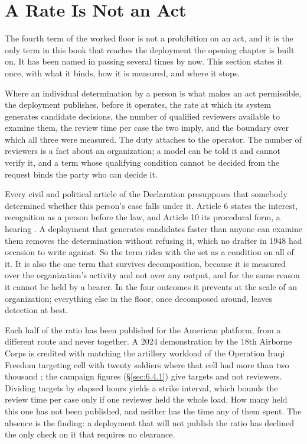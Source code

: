 \section{A Rate Is Not an Act}
\label{sec:3.6a}
The fourth term of the worked floor is not a prohibition on an act, and it is the only term in this book that reaches the deployment the opening chapter is built on. It has been named in passing several times by now. This section states it once, with what it binds, how it is measured, and where it stops.

Where an individual determination by a person is what makes an act permissible, the deployment publishes, before it operates, the rate at which its system generates candidate decisions, the number of qualified reviewers available to examine them, the review time per case the two imply, and the boundary over which all three were measured. The duty attaches to the operator. The number of reviewers is a fact about an organization; a model can be told it and cannot verify it, and a term whose qualifying condition cannot be decided from the request binds the party who can decide it.

Every civil and political article of the Declaration presupposes that somebody determined whether this person's case falls under it. Article 6 states the interest, recognition as a person before the law, and Article 10 its procedural form, a hearing \autocite{un1948udhr}. A deployment that generates candidates faster than anyone can examine them removes the determination without refusing it, which no drafter in 1948 had occasion to write against. So the term rides with the set as a condition on all of it. It is also the one term that survives decomposition, because it is measured over the organization's activity and not over any output, and for the same reason it cannot be held by a bearer. In the four outcomes it prevents at the scale of an organization; everything else in the floor, once decomposed around, leaves detection at best.

Each half of the ratio has been published for the American platform, from a different route and never together. A 2024 demonstration by the 18th Airborne Corps is credited with matching the artillery workload of the Operation Iraqi Freedom targeting cell with twenty soldiers where that cell had more than two thousand \autocite{defensenews2024maven,cset2024techcoalition}; the campaign figures (§\ref{sec:6.4.1}) give targets and not reviewers. Dividing targets by elapsed hours yields a strike interval, which bounds the review time per case only if one reviewer held the whole load. How many held this one has not been published, and neither has the time any of them spent. The absence is the finding: a deployment that will not publish the ratio has declined the only check on it that requires no clearance.

